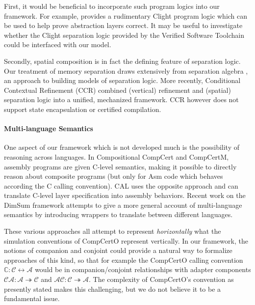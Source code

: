 \documentclass[acmsmall,screen,review,anonymous]{acmart}
\begin{document}
First, it would be beneficial to incorporate
such program logics into our framework.
For example, \citet{popl15} provides
a rudimentary Clight program logic which
can be used to help prove abstraction layers correct. 
It may be useful to investigate whether
the Clight separation logic provided by
the Verified Software Toolchain \cite{vst}
could be interfaced with our model.

Secondly,
spatial composition is in fact
the defining feature of separation logic.
Our treatment of memory separation
draws extensively from
separation algebra \cite{sepalg},
an approach to building models of separation logic.
More recently,
Conditional Contextual Refinement (CCR) \cite{ccr}
combined (vertical) refinement and (spatial) separation logic into
a unified, mechanized framework.
CCR however does not support state encapsulation
or certified compilation.


\paragraph{Multi-language Semantics} %

One aspect of our framework which is not developed much
is the possibility of reasoning across languages.
In Compositional CompCert and CompCertM,
assembly programs are given C-level semantics,
making it possible to directly reason about composite programs
(but only for Asm code which behaves according the C calling convention).
CAL uses the opposite approach and can translate
C-level layer specification into assembly behaviors.
Recent work on the DimSum framework \cite{dimsum}
attempts to give a more general account of
multi-language semantics
by introducing wrappers to translate between
different languages.

These various approaches all attempt
to represent \emph{horizontally} what
the simulation conventions of CompCertO represent vertically.
In our framework,
the notions of companion and conjoint
could provide a natural way to formalize
approaches of this kind,
so that for example the CompCertO calling convention
$\mathbb{C} : \mathcal{C} \leftrightarrow \mathcal{A}$
would be in companion/conjoint relationships with
adapter components
$\mathcal{CA} : \mathcal{A} \twoheadrightarrow \mathcal{C}$
and
$\mathcal{AC} : \mathcal{C} \twoheadrightarrow \mathcal{A}$.
The complexity of CompCertO's convention as presently stated
makes this challenging,
but we do not believe it to be a fundamental issue.
\end{document}
